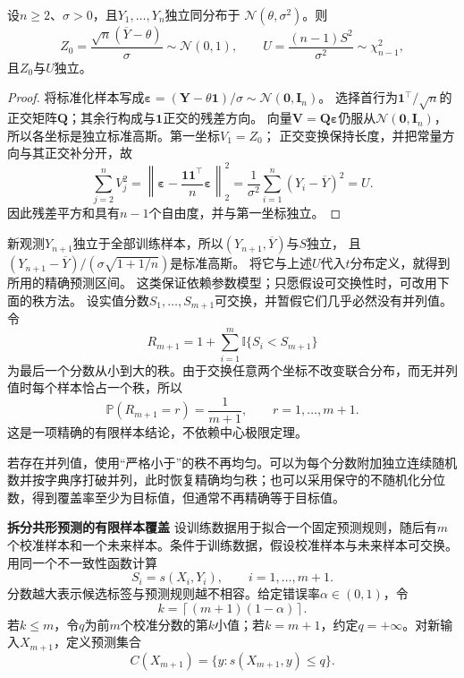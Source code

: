 \begin{lemma}[高斯样本的均值与残差分解]
\label{lem:statistics-gaussian-mean-residual}
设\(n\geq2\)、\(\sigma>0\)，且\(Y_1,\ldots,Y_n\)独立同分布于
\(\mathcal N(\theta,\sigma^2)\)。则
\[
 Z_0=\frac{\sqrt n(\overline Y-\theta)}{\sigma}\sim\mathcal N(0,1),
 \qquad U=\frac{(n-1)S^2}{\sigma^2}\sim\chi^2_{n-1},
\]
且\(Z_0\)与\(U\)独立。
\end{lemma}
\begin{proof}
将标准化样本写成\(\bm\varepsilon=(\bm Y-\theta\bm1)/\sigma\sim\mathcal N(\bm0,\bm I_n)\)。
选择首行为\(\bm1^\top/\sqrt n\)的正交矩阵\(\bm Q\)；其余行构成与\(\bm1\)正交的残差方向。
向量\(\bm V=\bm Q\bm\varepsilon\)仍服从\(\mathcal N(\bm0,\bm I_n)\)，
所以各坐标是独立标准高斯。第一坐标\(V_1=Z_0\)；
正交变换保持长度，并把常量方向与其正交补分开，故
\[
 \sum_{j=2}^nV_j^2
 =\left\|\bm\varepsilon-\frac{\bm1\bm1^\top}{n}\bm\varepsilon\right\|_2^2
 =\frac1{\sigma^2}\sum_{i=1}^n(Y_i-\overline Y)^2=U.
\]
因此残差平方和具有\(n-1\)个自由度，并与第一坐标独立。
\end{proof}
新观测\(Y_{n+1}\)独立于全部训练样本，所以\((Y_{n+1},\overline Y)\)与\(S\)独立，
且\((Y_{n+1}-\overline Y)/(\sigma\sqrt{1+1/n})\)是标准高斯。
将它与上述\(U\)代入\(t\)分布定义，就得到所用的精确预测区间。
这类保证依赖参数模型；只愿假设可交换性时，可改用下面的秩方法。
设实值分数\(S_1,\ldots,S_{m+1}\)可交换，并暂假它们几乎必然没有并列值。令
\[ R_{m+1}
  =1+\sum_{i=1}^{m}\mathbb{I}\{S_i<S_{m+1}\} \]
为最后一个分数从小到大的秩。由于交换任意两个坐标不改变联合分布，而无并列值时每个样本恰占一个秩，所以
\begin{equation}
  \mathbb{P}(R_{m+1}=r)=\frac{1}{m+1},
  \qquad r=1,\ldots,m+1.
  \label{eq:probability-uniform-rank}
\end{equation}
这是一项精确的有限样本结论，不依赖中心极限定理。

若存在并列值，使用“严格小于”的秩不再均匀。可以为每个分数附加独立连续随机数并按字典序打破并列，此时恢复精确均匀秩；也可以采用保守的不随机化分位数，得到覆盖率至少为目标值，但通常不再精确等于目标值。

\par\medskip\noindent\textbf{拆分共形预测的有限样本覆盖}\quad
设训练数据用于拟合一个固定预测规则，随后有\(m\)个校准样本和一个未来样本。条件于训练数据，假设校准样本与未来样本可交换。用同一个不一致性函数计算
\[ S_i=s(X_i,Y_i),
  \qquad i=1,\ldots,m+1. \]
分数越大表示候选标签与预测规则越不相容。给定错误率\(\alpha\in(0,1)\)，令
\[ k=\left\lceil(m+1)(1-\alpha)\right\rceil. \]
若\(k\leq m\)，令\(q\)为前\(m\)个校准分数的第\(k\)小值；若\(k=m+1\)，约定\(q=+\infty\)。对新输入\(X_{m+1}\)，定义预测集合
\begin{equation}
  C(X_{m+1})
  =
  \{y:s(X_{m+1},y)\leq q\}.
  \label{eq:probability-split-conformal-set}
\end{equation}

